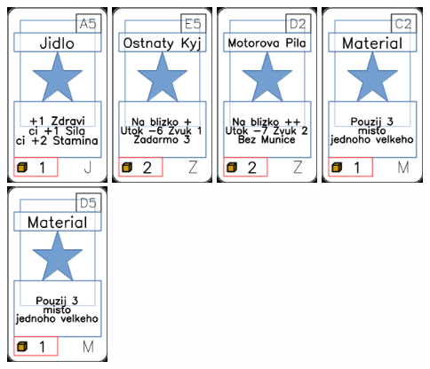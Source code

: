 \documentclass[a4paper]{article}
\begin{document}
	\includegraphics[width=3.0cm]{img-1_4}
	\includegraphics[width=3.0cm]{img-1_84}
	\includegraphics[width=3.0cm]{img-1_106}
	\includegraphics[width=3.0cm]{img-1_41}
	\includegraphics[width=3.0cm]{img-1_49}
\end{document}
